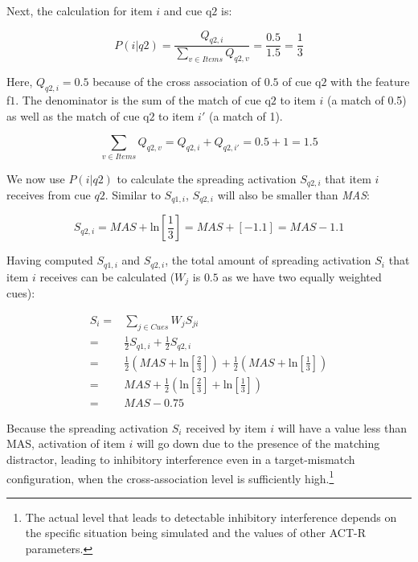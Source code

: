 \documentclass{cambridge7A}\usepackage[]{graphicx}\usepackage[]{color}
\begin{document}
\begin{enumerate}
Next, the calculation for item $i$ and cue q$2$ is:

\begin{equation} \label{eq:newfannoxassoc4}
	P(i|q2) = \frac{Q_{q2,i}}{\sum\limits_{v\in Items} Q_{q2,v}} = \frac{0.5}{1.5} = \frac{1}{3}
\end{equation}

Here, $Q_{q2,i} = 0.5$ because of the cross  association of $0.5$ of  cue q$2$ with the feature f$1$. The denominator is the sum of the match of cue q$2$ to item $i$ (a match of 0.5) as well as the match of cue q$2$ to item $i'$ (a match of 1).

\begin{equation}
\sum\limits_{v\in Items} Q_{q2,v} = Q_{q2,i} + Q_{q2,i'} = 0.5 + 1 = 1.5
\end{equation}

We now use $P(i|q2)$ to calculate the  spreading activation  $S_{q2,i}$ that item $i$ receives from cue $q2$. Similar to  $S_{q1,i}$, $S_{q2,i}$ will also be smaller than \textit{MAS}: 

\begin{equation}
S_{q2,i} = \textit{MAS} + \text{ln}\left[\frac{1}{3} \right] = \textit{MAS} + [-1.1] = \textit{MAS} - 1.1 
\end{equation}

Having computed $S_{q1,i}$ and $S_{q2,i}$, the total amount of spreading activation $S_i$ that item $i$ receives can be calculated ($W_j$ is $0.5$ as we have two equally weighted cues):

\begin{equation}
\begin{split}
      S_i =& \sum\limits_{j\in Cues} W_{j} S_{ji} \\
          =& \frac{1}{2} S_{q1,i} + \frac{1}{2} S_{q2,i}\\
          =& \frac{1}{2}\left(\textit{MAS} + \text{ln}\left[\frac{2}{3}\right]\right) + \frac{1}{2}\left(\textit{MAS} + \text{ln}\left[\frac{1}{3}\right]\right)\\
          =& \textit{MAS} +  \frac{1}{2}\left(\text{ln}\left[\frac{2}{3}\right] + \text{ln}\left[\frac{1}{3}\right]\right) \\
          =& \textit{MAS} - 0.75
\end{split}
\end{equation}

\label{crossasspageref}
Because the  spreading activation $S_i$ received by item $i$ will have a value less than MAS, activation of item $i$ will go down due to the presence of the matching distractor, leading to inhibitory interference even in a target-mismatch configuration, when the cross-association level is sufficiently high.\footnote{The actual level that leads to detectable inhibitory interference depends on the specific situation being simulated and the values of other ACT-R parameters.}
\end{enumerate}
\end{document}
